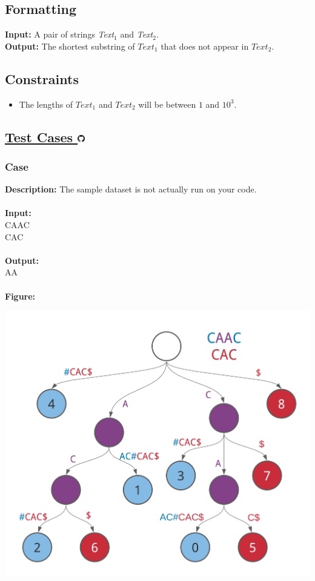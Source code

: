 \documentclass{article}
\newcommand{\code}[1]{{\fontfamily{pcr}\selectfont #1}}
\newcommand{\gitlogo}{\includegraphics[height=12.5]{c0/gitlogo.png}}
\begin{document}
\subsection*{Formatting}
\textbf{Input:} A pair of strings \emph{Text}$_1$ and \emph{Text}$_2$.\\
\noindent\textbf{Output:} The shortest substring of $Text_1$ that does not appear in $Text_2$.

\subsection*{Constraints}
\begin{itemize}
    \item The lengths of $Text_1$ and $Text_2$ will be between $1$ and $10^3$.
\end{itemize}
\pagebreak

\subsection*{\href{https://github.com/rjeveloff/BA_problemregister/tree/main/test_cases/chapter_9/9F}{Test Cases \gitlogo}}
\subsubsection*{Case }
\hline \vspace{5}
\textbf{Description:} The sample dataset is not actually run on your code.\\ \\
\noindent \textbf{Input:}\\
\code{CAAC\\ CAC}\\ \\
\noindent \textbf{Output:}\\
\code{AA}\\ \\
\noindent \textbf{Figure:}
\begin{center}
    \includegraphics[scale=0.15]{c9/logos/9F.png}
\end{center}
\pagebreak
\end{document}
